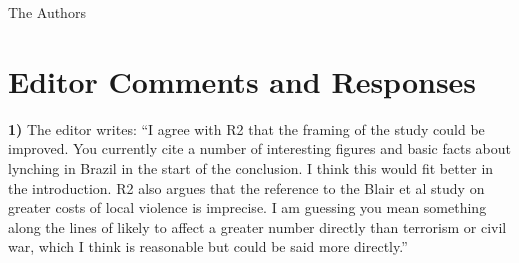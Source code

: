 \documentclass[a4paper,12pt]{article}
\begin{document}
\noindent The Authors

\newpage

\section*{Editor Comments and Responses}

\textbf{1)} The editor writes: ``I agree with R2 that the framing of the study
could be improved. You currently cite a number of interesting figures and basic
facts about lynching in Brazil in the start of the conclusion. I think this
would fit better in the introduction. R2 also argues that the reference to the
Blair et al study on greater costs of local violence is imprecise. I am
guessing you mean something along the lines of likely to affect a greater
number directly than terrorism or civil war, which I think is reasonable but
could be said more directly.''

\vspace{.3cm}
\end{document}
